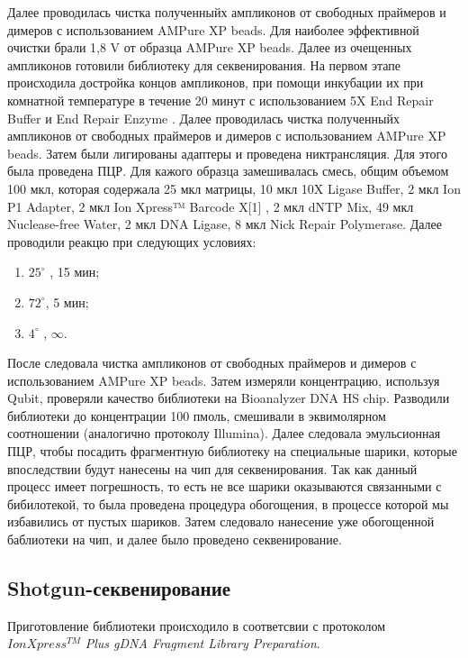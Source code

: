 Далее проводилась чистка полученныйх ампликонов от свободных праймеров и димеров с использованием AMPure XP beads.  Для наиболее эффективной очистки брали  1,8 V от образца AMPure XP beads. Далее из очещенных ампликонов готовили библиотеку для секвенирования. 
На первом этапе происходила достройка концов ампликонов, при помощи инкубации их при комнатной температуре в течение 20 минут с использованием 5X End Repair Buffer и End Repair Enzyme . Далее проводилась чистка полученныйх ампликонов от свободных праймеров и димеров с использованием AMPure XP beads. Затем были лигированы адаптеры и проведена никтрансляция. Для этого была проведена ПЦР. Для кажого образца замешивалась смесь, общим объемом 100 мкл, которая содержала 25 мкл матрицы, 10 мкл 10X Ligase Buffer, 2 мкл Ion P1 Adapter, 2 мкл Ion Xpress™ Barcode X[1] , 2 мкл dNTP Mix, 49 мкл Nuclease-free Water, 2 мкл DNA Ligase, 8 мкл Nick Repair Polymerase.   Далее проводили реакцю при следующих условиях:

\begin{enumerate}
	\item $25^{\circ}$ , 15 мин;
	\item $72^{\circ}$, 5 мин;
	\item $4^{\circ}$ ,  $\infty$.
\end{enumerate}

После следовала чистка ампликонов от свободных праймеров и димеров с использованием AMPure XP beads. Затем измеряли концентрацию, используя Qubit, проверяли качество библиотеки на Bioanalyzer DNA HS chip. Разводили библиотеки до концентрации 100 пмоль, смешивали в эквимолярном соотношении (аналогично протоколу Illumina). Далее следовала эмульсионная ПЦР, чтобы посадить фрагментную библиотеку на специальные шарики, которые впоследствии будут нанесены на чип для секвенирования. Так как данный процесс имеет погрешность, то есть не все шарики оказываются связанными с бибилотекой, то была проведена процедура обогощения, в процессе которой мы избавились от пустых шариков. Затем следовало нанесение уже обогощенной баблиотеки на чип, и далее было проведено секвенирование.




\subsection{Shotgun-секвенирование}  \label{subsect1_2_4}
Приготовление библиотеки происходило в соответсвии с протоколом $IonXpress^{TM}$ \textit{Plus gDNA Fragment Library Preparation}.

